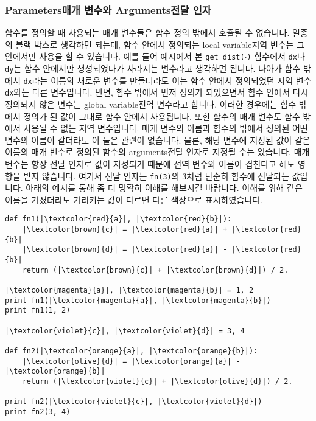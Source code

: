 \documentclass[../main.tex]{subfiles}
\begin{document}
\subsubsection{Parameters매개 변수와 Arguments전달 인자}
함수를 정의할 때 사용되는 매개 변수들은 함수 정의 밖에서 호출될 수 없습니다.
일종의 블랙 박스로 생각하면 되는데, 함수 안에서 정의되는 local variable지역 변수는 그 안에서만 사용을 할 수 있습니다.
예를 들어 예시에서 본 \texttt{get\_dist($\cdot$)} 함수에서 \texttt{dx}나 \texttt{dy}는 함수 안에서만 생성되었다가 사라지는 변수라고 생각하면 됩니다.
나아가 함수 밖에서 \texttt{dx}라는 이름의 새로운 변수를 만들더라도 이는 함수 안에서 정의되었던 지역 변수 \texttt{dx}와는 다른 변수입니다.
반면, 함수 밖에서 먼저 정의가 되었으면서 함수 안에서 다시 정의되지 않은 변수는 global variable전역 변수라고 합니다.
이러한 경우에는 함수 밖에서 정의가 된 값이 그대로 함수 안에서 사용됩니다.
또한 함수의 매개 변수도 함수 밖에서 사용될 수 없는 지역 변수입니다.
매개 변수의 이름과 함수의 밖에서 정의된 어떤 변수의 이름이 같더라도 이 둘은 관련이 없습니다.
물론, 해당 변수에 지정된 값이 같은 이름의 매개 변수로 정의된 함수의 arguments전달 인자로 지정될 수는 있습니다.
매개 변수는 항상 전달 인자로 값이 지정되기 때문에 전역 변수와 이름이 겹친다고 해도 영향을 받지 않습니다.
여기서 전달 인자는 \texttt{fn(3)}의 3처럼 단순히 함수에 전달되는 값입니다.
아래의 예시를 통해 좀 더 명확히 이해를 해보시길 바랍니다.
이해를 위해 같은 이름을 가졌더라도 가리키는 값이 다르면 다른 색상으로 표시하였습니다.
\begin{verbatim}
def fn1(|\textcolor{red}{a}|, |\textcolor{red}{b}|):
	|\textcolor{brown}{c}| = |\textcolor{red}{a}| + |\textcolor{red}{b}|
	|\textcolor{brown}{d}| = |\textcolor{red}{a}| - |\textcolor{red}{b}|
	return (|\textcolor{brown}{c}| + |\textcolor{brown}{d}|) / 2.

|\textcolor{magenta}{a}|, |\textcolor{magenta}{b}| = 1, 2
print fn1(|\textcolor{magenta}{a}|, |\textcolor{magenta}{b}|)
print fn1(1, 2)

|\textcolor{violet}{c}|, |\textcolor{violet}{d}| = 3, 4

def fn2(|\textcolor{orange}{a}|, |\textcolor{orange}{b}|):
	|\textcolor{olive}{d}| = |\textcolor{orange}{a}| - |\textcolor{orange}{b}|
	return (|\textcolor{violet}{c}| + |\textcolor{olive}{d}|) / 2.
	
print fn2(|\textcolor{violet}{c}|, |\textcolor{violet}{d}|)
print fn2(3, 4)
\end{verbatim}
\end{document}
